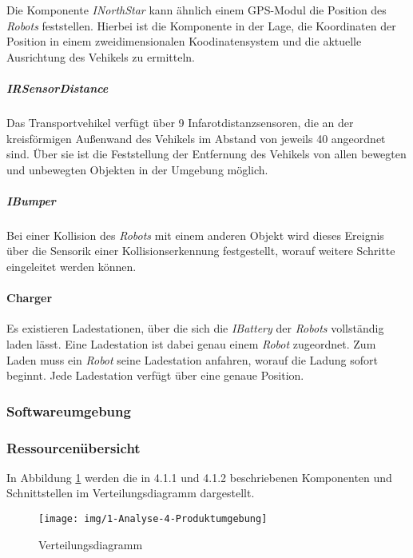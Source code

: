     Die Komponente \emph{INorthStar} kann ähnlich einem GPS-Modul die
    Position des \emph{Robots} feststellen. Hierbei ist die Komponente in
    der Lage, die Koordinaten der Position in einem zweidimensionalen
    Koodinatensystem und die aktuelle Ausrichtung des Vehikels zu ermitteln.

    \subparagraph{IRSensorDistance}\label{irsensordistance} \newline

    Das Transportvehikel verfügt über 9 Infarotdistanzsensoren, die an der
    kreisförmigen Außenwand des Vehikels im Abstand von jeweils 40
    angeordnet sind. Über sie ist die Feststellung der Entfernung des
    Vehikels von allen bewegten und unbewegten Objekten in der Umgebung
    möglich.

    \subparagraph{IBumper}\label{ibumper} \newline

    Bei einer Kollision des \emph{Robots} mit einem anderen Objekt wird
    dieses Ereignis über die Sensorik einer Kollisionserkennung festgestellt, worauf
    weitere Schritte eingeleitet werden können.

    \paragraph{Charger}\label{charger} \newline

    Es existieren Ladestationen, über die sich die \emph{IBattery} der
    \emph{Robots} vollständig laden lässt. Eine Ladestation ist dabei genau
    einem \emph{Robot} zugeordnet. Zum Laden muss ein \emph{Robot} seine
    Ladestation anfahren, worauf die Ladung sofort beginnt. Jede Ladestation
    verfügt über eine genaue Position.

    \subsubsection{Softwareumgebung}



\subsubsection{Ressourcenübersicht}
    In Abbildung \ref{fig:4-1-3-verteilungsdiagramm} werden die in 4.1.1 und 4.1.2 beschriebenen
    Komponenten und Schnittstellen im Verteilungsdiagramm dargestellt.

    \begin{figure}[H]
      \centering
      \texttt{[image: img/1-Analyse-4-Produktumgebung]}
      \caption{Verteilungsdiagramm}
      \label{fig:4-1-3-verteilungsdiagramm}
    \end{figure}
